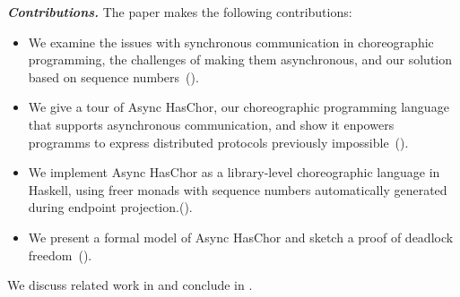 \vspace{10pt}
\noindent \textit{\textbf{Contributions.}} The paper makes the following contributions:
%
\begin{itemize}
\item
    We examine the issues with synchronous communication in choreographic programming, the challenges of making them asynchronous, and our solution based on sequence numbers~().
\item
    We give a tour of Async HasChor, our choreographic programming language that supports asynchronous communication, and show it enpowers programms to express distributed protocols previously impossible~().
\item
    We implement Async HasChor as a library-level choreographic language in Haskell, using freer monads with sequence numbers automatically generated during endpoint projection.().
\item
    We present a formal model of Async HasChor and sketch a proof of deadlock freedom~().
\end{itemize}
%
We discuss related work in  and conclude in .
